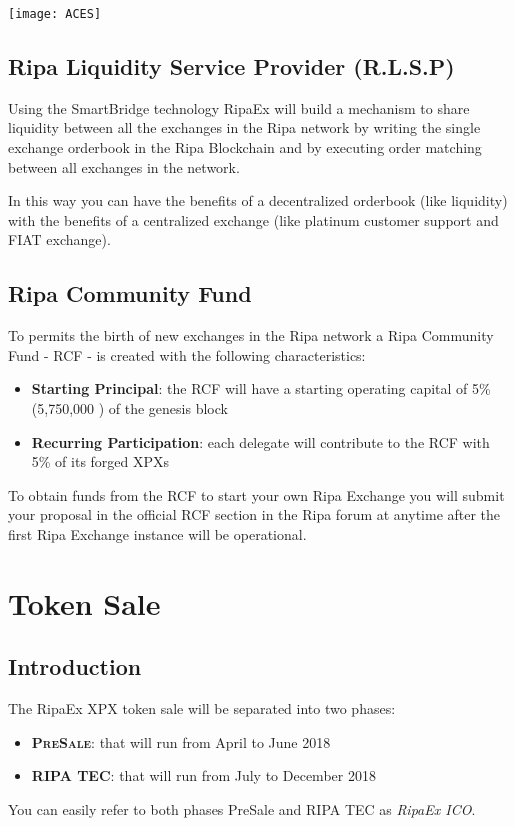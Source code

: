 \documentclass[11pt,fleqn]{book} %
\begin{document}
\begin{center}
	\texttt{[image: ACES]}
\end{center}

\section{Ripa Liquidity Service Provider (R.L.S.P)}
Using the SmartBridge technology RipaEx will build a mechanism to share liquidity between all the exchanges in the Ripa network
by writing the single exchange orderbook in the Ripa Blockchain and by executing order matching between all exchanges in the network.

In this way you can have the benefits of a decentralized orderbook (like liquidity) with the benefits of a centralized exchange (like
platinum customer support and FIAT exchange).

\section{Ripa Community Fund}
To permits the birth of new exchanges in the Ripa network a Ripa Community Fund - RCF - is created with the following characteristics:
\begin{itemize}
	\item \textbf{Starting Principal}: the RCF will have a starting operating capital of 5\% (5,750,000 \PHP) of the genesis block
	\item \textbf{Recurring Participation}: each delegate will contribute to the RCF with 5\% of its forged XPXs
\end{itemize}
\vspace{5mm}
To obtain funds from the RCF to start your own Ripa Exchange you will submit your proposal in the official RCF section in the Ripa forum at
anytime after the first Ripa Exchange instance will be operational.


\chapter{Token Sale}
\section{Introduction}
The RipaEx XPX token sale will be separated into two phases:
	\begin{itemize}
		\item \textbf{\textsc{PreSale}}: that will run from April to June 2018
		\item \textbf{\textsc{RIPA TEC}}: that will run from July to December 2018
	\end{itemize}
\vspace{5mm}
You can easily refer to both phases PreSale and RIPA TEC as \textit{RipaEx ICO}.
\end{document}
